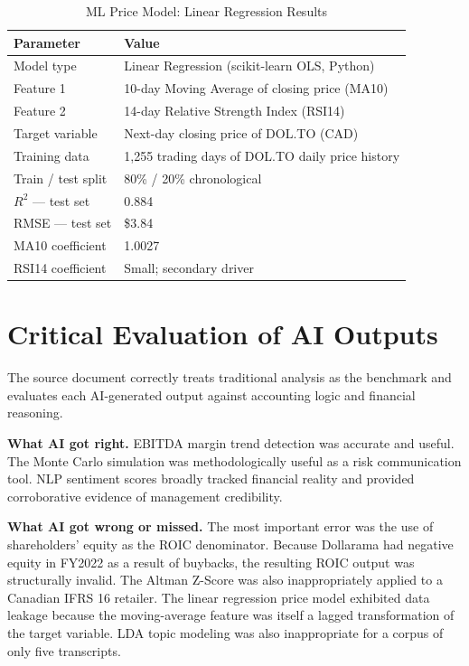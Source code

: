 \documentclass[11pt]{article}
\begin{document}
\begingroup
\small
\begin{table}[H]
\centering
\caption{ML Price Model: Linear Regression Results}
\renewcommand{\arraystretch}{1.2}
\begin{tabularx}{\linewidth}{Y Y}
\toprule
{}
Parameter & Value \\
\midrule
Model type & Linear Regression (scikit-learn OLS, Python) \\
Feature 1 & 10-day Moving Average of closing price (MA10) \\
Feature 2 & 14-day Relative Strength Index (RSI14) \\
Target variable & Next-day closing price of DOL.TO (CAD) \\
Training data & 1,255 trading days of DOL.TO daily price history \\
Train / test split & 80\% / 20\% chronological \\
$R^2$ --- test set & 0.884 \\
RMSE --- test set & \$3.84 \\
MA10 coefficient & 1.0027 \\
RSI14 coefficient & Small; secondary driver \\
\bottomrule
\end{tabularx}
\end{table}
\endgroup


\clearpage
\section{Critical Evaluation of AI Outputs}
The source document correctly treats traditional analysis as the benchmark and evaluates each AI-generated output against accounting logic and financial reasoning.

\textbf{What AI got right.} EBITDA margin trend detection was accurate and useful. The Monte Carlo simulation was methodologically useful as a risk communication tool. NLP sentiment scores broadly tracked financial reality and provided corroborative evidence of management credibility.

\textbf{What AI got wrong or missed.} The most important error was the use of shareholders' equity as the ROIC denominator. Because Dollarama had negative equity in FY2022 as a result of buybacks, the resulting ROIC output was structurally invalid. The Altman Z-Score was also inappropriately applied to a Canadian IFRS 16 retailer. The linear regression price model exhibited data leakage because the moving-average feature was itself a lagged transformation of the target variable. LDA topic modeling was also inappropriate for a corpus of only five transcripts.
\end{document}
